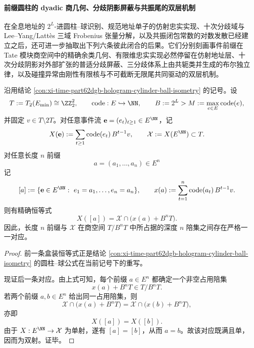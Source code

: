 \paragraph{前缀圆柱的 dyadic 商几何、分歧阴影屏蔽与共振尾的双层机制}
在全息地址的 \(2^L\)-进圆柱--球识别、规范地址单子的仿射忠实实现、十次分歧域与 Lee--Yang/Latt\`es 三域 Frobenius 张量分解，以及共振闭包常数的对数发散已经建立之后，还可进一步抽取出下列六条彼此闭合的后果。它们分别刻画事件前缀在 Tate 模块商空间中的精确余类几何、有限维忠实实现必然停留在仿射地址层、十次分歧阴影对外部扩张的普适分歧屏蔽、三分歧体系上由共轭类并生成的布尔独立律，以及碰撞异常由刚性有限核与不可截断无限尾共同驱动的双层机制。

\begin{theorem}\label{thm:xi-time-part75-hologram-prefix-cylinder-coset-equivalence}
沿用结论 \ref{con:xi-time-part62dgb-hologram-cylinder-ball-isometry} 的记号。设
\[
T:=T_2(E_{\min})\cong \ZZ_2^2,
\qquad
\mathrm{code}:E\hookrightarrow \NN,
\qquad
B:=2^L>M:=\max_{e\in E}\mathrm{code}(e),
\]
并固定 \(v\in T\setminus 2T\)。对任意事件流 \(\mathbf e=(e_t)_{t\ge 1}\in E^{\NN}\)，记
\[
X(\mathbf e):=\sum_{t\ge 1}\mathrm{code}(e_t)\,B^{t-1}v,
\qquad
\mathcal X:=X(E^{\NN})\subset T.
\]
对任意长度 \(n\) 前缀
\[
a=(a_1,\dots,a_n)\in E^n
\]
记
\[
[a]:=\{\mathbf e\in E^{\NN}:\ e_1=a_1,\dots,e_n=a_n\},
\qquad
x(a):=\sum_{t=1}^{n}\mathrm{code}(a_t)\,B^{t-1}v.
\]
则有精确恒等式
\[
\boxed{\;
X([a])=\mathcal X\cap \bigl(x(a)+B^nT\bigr).\;}
\]
因此，长度 \(n\) 前缀与 \(\mathcal X\) 在商空间 \(T/B^nT\) 中所占据的深度 \(n\) 陪集之间存在严格一一对应。
\end{theorem}
\begin{proof}
前一条盒装恒等式正是结论 \ref{con:xi-time-part62dgb-hologram-cylinder-ball-isometry} 的圆柱--球公式在当前记号下的重写。

现证后一条对应。由上式可知，每个前缀 \(a\in E^n\) 都确定一个非空占用陪集
\[
x(a)+B^nT\in T/B^nT.
\]
若两个前缀 \(a,b\in E^n\) 给出同一占用陪集，则
\[
\mathcal X\cap \bigl(x(a)+B^nT\bigr)
=
\mathcal X\cap \bigl(x(b)+B^nT\bigr),
\]
亦即
\[
X([a])=X([b]).
\]
由于 \(X:E^{\NN}\to \mathcal X\) 为单射，遂有 \([a]=[b]\)，从而 \(a=b\)。故该对应既满且单，因而为双射。证毕。
\end{proof}

